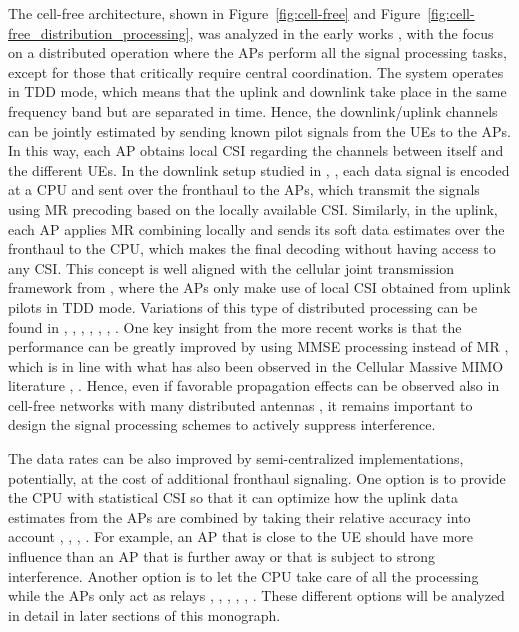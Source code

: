 The cell-free architecture, shown in Figure~\ref{fig:cell-free} and Figure~\ref{fig:cell-free_distribution_processing}, was analyzed in the early works \cite{Nayebi2017a}, \cite{Ngo2017b} with the focus on a distributed operation where the \glspl{AP} perform all the signal processing tasks, except for those that critically require central coordination. The system operates in \gls{TDD} mode, which means that the uplink and downlink take place in the same frequency band but are separated in time. Hence, the downlink/uplink channels can be jointly estimated by sending known pilot signals from the \glspl{UE} to the \glspl{AP}. In this way, each \gls{AP} obtains local \gls{CSI} regarding the channels between itself and the different \glspl{UE}. In the downlink setup studied in \cite{Nayebi2017a}, \cite{Ngo2017b}, each data signal is encoded at a \gls{CPU} and sent over the fronthaul to the \glspl{AP}, which transmit the signals using \gls{MR} precoding based on the locally available \gls{CSI}. Similarly, in the uplink, each \gls{AP} applies \gls{MR} combining locally and sends its soft data estimates over the fronthaul to the \gls{CPU}, which makes the final decoding without having access to any \gls{CSI}.
This concept is well aligned with the cellular joint transmission framework from \cite{Bjornson2010c}, where the \glspl{AP} only make use of local \gls{CSI} obtained from uplink pilots in \gls{TDD} mode. 
Variations of this type of distributed processing can be found in \cite{Bashar2019a}, \cite{Bjornson2019c}, \cite{Buzzi2017a}, \cite{Fan2019a}, \cite{Ozdogan2018a}, \cite{Yang2019a}, \cite{Zhang2018a}. One key insight from the more recent works is that the performance can be greatly improved by using \gls{MMSE} processing instead of \gls{MR} \cite{Bjornson2019c}, which is in line with what has also been observed in the Cellular Massive \gls{MIMO} literature \cite{BjornsonHS17}, \cite{Sanguinetti2019a}.
Hence, even if favorable propagation effects can be observed also in cell-free networks with many distributed antennas \cite{Chen2018b}, it remains important to design the signal processing schemes to actively suppress interference.


The data rates can be also improved by semi-centralized implementations, potentially, at the cost of additional fronthaul signaling. One option is to provide the \gls{CPU} with statistical \gls{CSI} so that it can optimize how the uplink data estimates from the \glspl{AP} are combined by taking their relative accuracy into account \cite{Adhikary2017a}, \cite{Bjornson2019c}, \cite{Nayebi2016a}, \cite{Ngo2018b}. 
For example, an \gls{AP} that is close to the \gls{UE} should have more influence than an \gls{AP} that is further away or that is subject to strong interference.
Another option is to let the \gls{CPU} take care of all the processing while the \glspl{AP} only act as relays \cite{Bashar2018a}, \cite{Bjornson2019c}, \cite{Chen2018b}, \cite{Nayebi2016a}, \cite{Riera2018a}, \cite{Yang2019a}. These different options will be analyzed in detail in later sections of this monograph.

